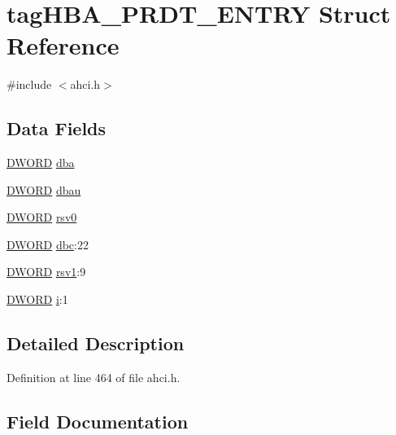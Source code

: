 \hypertarget{structtagHBA__PRDT__ENTRY}{}\section{tag\+H\+B\+A\+\_\+\+P\+R\+D\+T\+\_\+\+E\+N\+T\+RY Struct Reference}
\label{structtagHBA__PRDT__ENTRY}


{\ttfamily \#include $<$ahci.\+h$>$}

\subsection*{Data Fields}
\begin{DoxyCompactItemize}
\item 
\hyperlink{ahci_8h_af483253b2143078cede883fc3c111ad2}{D\+W\+O\+RD} \hyperlink{structtagHBA__PRDT__ENTRY_a71fdffa8777f52b27493937d20808ed0}{dba}
\item 
\hyperlink{ahci_8h_af483253b2143078cede883fc3c111ad2}{D\+W\+O\+RD} \hyperlink{structtagHBA__PRDT__ENTRY_ad890ac379c385e24c3d970eadfd4d843}{dbau}
\item 
\hyperlink{ahci_8h_af483253b2143078cede883fc3c111ad2}{D\+W\+O\+RD} \hyperlink{structtagHBA__PRDT__ENTRY_a73f608e05caeffce5ba5404f07e63561}{rsv0}
\item 
\hyperlink{ahci_8h_af483253b2143078cede883fc3c111ad2}{D\+W\+O\+RD} \hyperlink{structtagHBA__PRDT__ENTRY_aaa3b5685ca18e1b0fea8842c2ed946e1}{dbc}\+:22
\item 
\hyperlink{ahci_8h_af483253b2143078cede883fc3c111ad2}{D\+W\+O\+RD} \hyperlink{structtagHBA__PRDT__ENTRY_a435810364fcb775552b75b2d6e59461c}{rsv1}\+:9
\item 
\hyperlink{ahci_8h_af483253b2143078cede883fc3c111ad2}{D\+W\+O\+RD} \hyperlink{structtagHBA__PRDT__ENTRY_ac3a73e3528f47564c5960ebf012a43be}{i}\+:1
\end{DoxyCompactItemize}


\subsection{Detailed Description}


Definition at line 464 of file ahci.\+h.



\subsection{Field Documentation}
